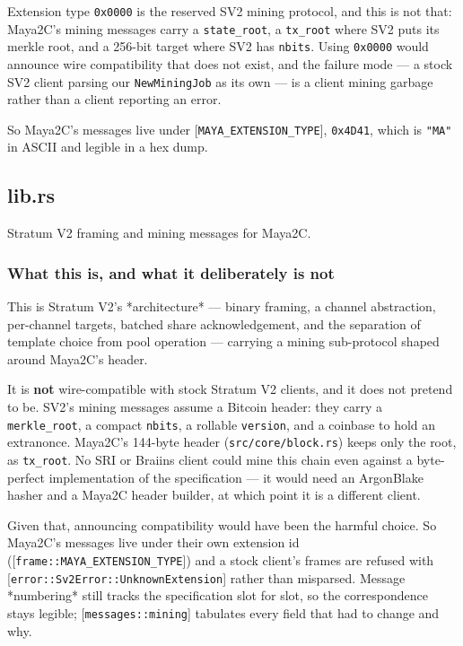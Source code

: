 \documentclass[11pt,a4paper]{article}
\begin{document}
Extension type \texttt{0x0000} is the reserved SV2 mining protocol, and this is not
that: Maya2C's mining messages carry a \texttt{state\_root}, a \texttt{tx\_root} where SV2
puts its merkle root, and a 256-bit target where SV2 has \texttt{nbits}. Using \texttt{0x0000} would announce
wire compatibility that does not exist, and the failure mode — a stock SV2
client parsing our \texttt{NewMiningJob} as its own — is a client mining garbage
rather than a client reporting an error.

So Maya2C's messages live under [\texttt{MAYA\_EXTENSION\_TYPE}], \texttt{0x4D41}, which is
\texttt{"MA"} in ASCII and legible in a hex dump.

\subsection{lib.rs}
Stratum V2 framing and mining messages for Maya2C.

\subsubsection{What this is, and what it deliberately is not}

This is Stratum V2's *architecture* — binary framing, a channel abstraction,
per-channel targets, batched share acknowledgement, and the separation of
template choice from pool operation — carrying a mining sub-protocol shaped
around Maya2C's header.

It is \textbf{not} wire-compatible with stock Stratum V2 clients, and it does not
pretend to be. SV2's mining messages assume a Bitcoin header: they carry a
\texttt{merkle\_root}, a compact \texttt{nbits}, a rollable \texttt{version}, and a coinbase to
hold an extranonce. Maya2C's 144-byte header (\texttt{src/core/block.rs}) keeps
only the root, as \texttt{tx\_root}. No SRI or Braiins client could mine this chain even against a
byte-perfect implementation of the specification — it would need an
ArgonBlake hasher and a Maya2C header builder, at which point it is a
different client.

Given that, announcing compatibility would have been the harmful choice. So
Maya2C's messages live under their own extension id
([\texttt{frame::MAYA\_EXTENSION\_TYPE}]) and a stock client's frames are refused with
[\texttt{error::Sv2Error::UnknownExtension}] rather than misparsed. Message
*numbering* still tracks the specification slot for slot, so the
correspondence stays legible; [\texttt{messages::mining}] tabulates every field that
had to change and why.
\end{document}

